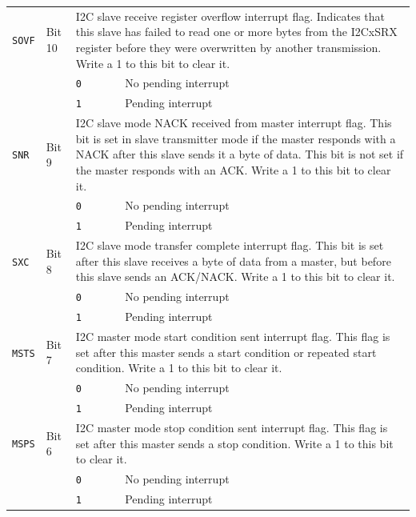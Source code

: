 \begin{tabularx}{\textwidth}{ l l l X }
\hline
\texttt{SOVF} & Bit 10 & \multicolumn{2}{X}{I2C slave receive register overflow interrupt flag. Indicates that this slave has failed to read one or more bytes from the I2CxSRX register before they were overwritten by another transmission. Write a 1 to this bit to clear it.} \\
 & & \texttt{0} & No pending interrupt \\
 & & \cellcolor{tablehighlightcolor}\texttt{1} & \cellcolor{tablehighlightcolor}Pending interrupt \\
\hline
\texttt{SNR} & Bit 9 & \multicolumn{2}{X}{I2C slave mode NACK received from master interrupt flag. This bit is set in slave transmitter mode if the master responds with a NACK after this slave sends it a byte of data. This bit is not set if the master responds with an ACK. Write a 1 to this bit to clear it.} \\
 & & \texttt{0} & No pending interrupt \\
 & & \cellcolor{tablehighlightcolor}\texttt{1} & \cellcolor{tablehighlightcolor}Pending interrupt \\
\hline
\texttt{SXC} & Bit 8 & \multicolumn{2}{X}{I2C slave mode transfer complete interrupt flag. This bit is set after this slave receives a byte of data from a master, but before this slave sends an ACK/NACK. Write a 1 to this bit to clear it.} \\
 & & \texttt{0} & No pending interrupt \\
 & & \cellcolor{tablehighlightcolor}\texttt{1} & \cellcolor{tablehighlightcolor}Pending interrupt \\
\hline
\texttt{MSTS} & Bit 7 & \multicolumn{2}{X}{I2C master mode start condition sent interrupt flag. This flag is set after this master sends a start condition or repeated start condition. Write a 1 to this bit to clear it.} \\
 & & \texttt{0} & No pending interrupt \\
 & & \cellcolor{tablehighlightcolor}\texttt{1} & \cellcolor{tablehighlightcolor}Pending interrupt \\
\hline
\texttt{MSPS} & Bit 6 & \multicolumn{2}{X}{I2C master mode stop condition sent interrupt flag. This flag is set after this master sends a stop condition. Write a 1 to this bit to clear it.} \\
 & & \texttt{0} & No pending interrupt \\
 & & \cellcolor{tablehighlightcolor}\texttt{1} & \cellcolor{tablehighlightcolor}Pending interrupt \\

\end{tabularx}
